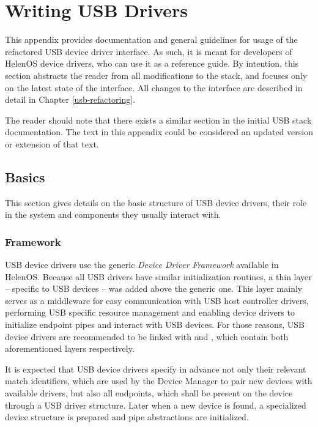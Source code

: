 \chapter{Writing USB Drivers}
\label{chap:usb-drivers}

This appendix provides documentation and general guidelines for usage of the
refactored USB device driver interface. As such, it is meant for developers of
HelenOS device drivers, who can use it as a reference guide. By intention, this
section abstracts the reader from all modifications to the stack, and focuses
only on the latest state of the interface. All changes to the interface are
described in detail in Chapter \ref{usb-refactoring}.

The reader should note that there exists a similar section in the initial USB
stack documentation. The text in this appendix could be considered an updated
version or extension of that text.


\section{Basics}

This section gives details on the basic structure of USB device drivers, their
role in the system and components they usually interact with.


\subsection{Framework}

USB device drivers use the generic \textit{Device Driver Framework} available in
HelenOS. Because all USB drivers have similar initialization routines, a thin
layer -- specific to USB devices -- was added above the generic one. This layer
mainly serves as a middleware for easy communication with USB host controller
drivers, performing USB specific resource management and enabling device drivers
to initialize endpoint pipes and interact with USB devices. For those reasons,
USB device drivers are recommended to be linked with  and
, which contain both aforementioned layers respectively.

It is expected that USB device drivers specify in advance not only their
relevant match identifiers, which are used by the Device Manager to pair new
devices with available drivers, but also all endpoints, which shall be present
on the device through a USB driver structure. Later when a new device is found,
a specialized device structure is prepared and pipe abstractions are
initialized.

